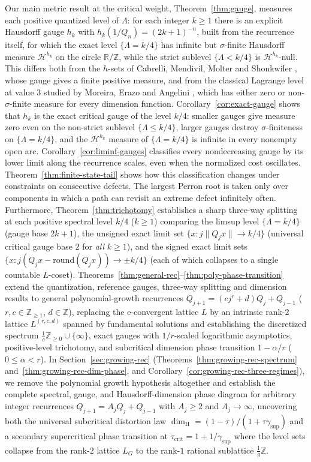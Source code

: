 \documentclass[11pt]{article}
\theoremstyle{definition}
\theoremstyle{remark}
\newcommand{\R}{\mathbb{R}}
\newcommand{\Z}{\mathbb{Z}}
\newcommand{\ee}{\mathrm{e}}
\newcommand{\dimH}{\dim_{\mathrm{H}}}
\newcommand{\Lam}{\Lambda}
\begin{document}
Our main metric result at the critical weight, Theorem~\ref{thm:gauge},
measures each positive quantized level of $\Lam$: for each integer $k\ge1$
there is an explicit Hausdorff gauge $h_k$ with $h_k(1/Q_n)=(2k+1)^{-n}$, built
from the recurrence itself, for which the exact level $\{\Lam=k/4\}$ has
infinite but $\sigma$-finite Hausdorff measure $\mathcal H^{h_k}$ on the circle
$\R/\Z$, while the strict sublevel $\{\Lam<k/4\}$ is $\mathcal H^{h_k}$-null.
This differs both from the $h$-sets of Cabrelli, Mendivil, Molter and
Shonkwiler \cite[\S5, Theorem~3]{CMMS}, whose gauge gives a finite positive
measure, and from the classical Lagrange level at value $3$ studied by Moreira,
Erazo and Angelini \cite{MEA}, which has either zero or non-$\sigma$-finite
measure for every dimension function. Corollary~\ref{cor:exact-gauge} shows
that $h_k$ is the exact critical gauge of the level $k/4$: smaller gauges give
measure zero even on the non-strict sublevel $\{\Lam\le k/4\}$, larger gauges
destroy $\sigma$-finiteness on $\{\Lam=k/4\}$, and the $\mathcal H^{h_k}$
measure of $\{\Lam=k/4\}$ is infinite in every nonempty open arc.
Corollary~\ref{cor:liminf-gauges} classifies every nondecreasing gauge by
its lower limit along the recurrence scales, even when the normalized
cost oscillates. Theorem~\ref{thm:finite-state-tail} shows how this
classification changes under constraints on consecutive defects.
The largest Perron root is taken only over components in which a path
can revisit an extreme defect infinitely often.
Furthermore, Theorem~\ref{thm:trichotomy} establishes a sharp three-way
splitting at each positive spectral level $k/4$ ($k\ge1$) comparing the limsup
level $\{\Lam=k/4\}$ (gauge base $2k+1$), the unsigned exact limit set
$\{x:j\|Q_jx\|\to k/4\}$ (universal critical gauge base $2$ for \emph{all}
$k\ge1$), and the signed exact limit sets
$\{x:j(Q_jx-\mathrm{round}(Q_jx))\to\pm k/4\}$ (each of which collapses to a
single countable $L$-coset). Theorems~\ref{thm:general-rec}--\ref{thm:poly-phase-transition}
extend the quantization, reference gauges, three-way splitting and
dimension results to general polynomial-growth recurrences
$Q_{j+1}=(cj^r+d)Q_j+Q_{j-1}$ ($r,c\in\Z_{\ge1}$, $d\in\Z$), replacing the
$\ee$-convergent lattice $L$ by an intrinsic rank-$2$ lattice $L^{(r,c,d)}$
spanned by fundamental solutions and establishing the discretized spectrum
$\frac1c\Z_{\ge0}\cup\{\infty\}$, exact gauges with $1/r$-scaled logarithmic
asymptotics, positive-level trichotomy, and subcritical dimension phase
transition $1-\alpha/r$ ($0\le\alpha<r$). In Section~\ref{sec:growing-rec}
(Theorems~\ref{thm:growing-rec-spectrum} and~\ref{thm:growing-rec-dim-phase},
and Corollary~\ref{cor:growing-rec-three-regimes}), we remove the polynomial
growth hypothesis altogether and establish the complete spectral, gauge, and
Hausdorff-dimension phase diagram for arbitrary integer recurrences
$Q_{j+1}=A_jQ_j+Q_{j-1}$ with $A_j\ge2$ and $A_j\to\infty$, uncovering both the
universal subcritical distortion law $\dimH=(1-\tau)/(1+\tau\gamma_{\sup})$ and
a secondary supercritical phase transition at $\tau_{\mathrm{crit}}=1+1/\gamma_{\sup}$
where the level sets collapse from the rank-$2$ lattice $L_G$ to the rank-$1$
rational sublattice $\frac{1}{g}\Z$.
\end{document}
